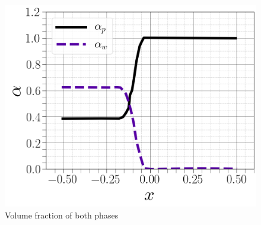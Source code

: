 \documentclass[11pt]{report}
\begin{document}
%
 \begin{figure}[ht!]
 \begin{center}
 
 \includegraphics[trim=0cm 0cm 0cm 0cm,clip,scale=0.25]{figs/5.png}
 \caption{ \footnotesize { Volume fraction of both phases }}
 \label{fig:gauss}
 \end{center}
 \end{figure} 
\end{document}
